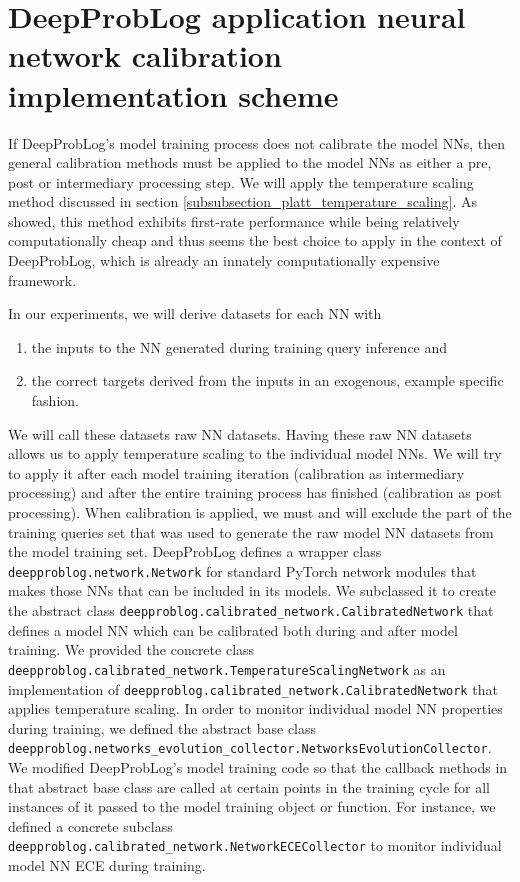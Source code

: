 \section{DeepProbLog application neural network calibration implementation scheme}
If DeepProbLog's model training process does not calibrate the model NNs, then general calibration methods must be applied to the model NNs as either a pre, post or intermediary processing step. We will apply the temperature scaling method discussed in section \ref{subsubsection_platt_temperature_scaling}. As \cite{guo2017calibration} showed, this method exhibits first-rate performance while being relatively computationally cheap and thus seems the best choice to apply in the context of DeepProbLog, which is already an innately computationally expensive framework. \par
In our experiments, we will derive datasets for each NN with
\begin{enumerate}
\item the inputs to the NN generated during training query inference and
\item the correct targets derived from the inputs in an exogenous, example specific fashion.
\end{enumerate}
We will call these datasets raw NN datasets. Having these raw NN datasets allows us to apply temperature scaling to the individual model NNs. We will try to apply it after each model training iteration (calibration as intermediary processing) and after the entire training process has finished (calibration as post processing). When calibration is applied, we must and will exclude the part of the training queries set that was used to generate the raw model NN datasets from the model training set. DeepProbLog defines a wrapper class \texttt{deepproblog.network.Network} for standard PyTorch network modules that makes those NNs that can be included in its models. We subclassed it to create the abstract class \texttt{deepproblog.calibrated\_network.CalibratedNetwork} that defines a model NN which can be calibrated both during and after model training. We provided the concrete class \\ \texttt{deepproblog.calibrated\_network.TemperatureScalingNetwork} as an implementation of \texttt{deepproblog.calibrated\_network.CalibratedNetwork} that applies temperature scaling. In order to monitor individual model NN properties during training, we defined the abstract base class \\ \texttt{deepproblog.networks\_evolution\_collector.NetworksEvolutionCollector}. \\ We modified DeepProbLog's model training code so that the callback methods in that abstract base class are called at certain points in the training cycle for all instances of it passed to the model training object or function. For instance, we defined a concrete subclass \texttt{deepproblog.calibrated\_network.NetworkECECollector} to monitor individual model NN ECE during training. \par
